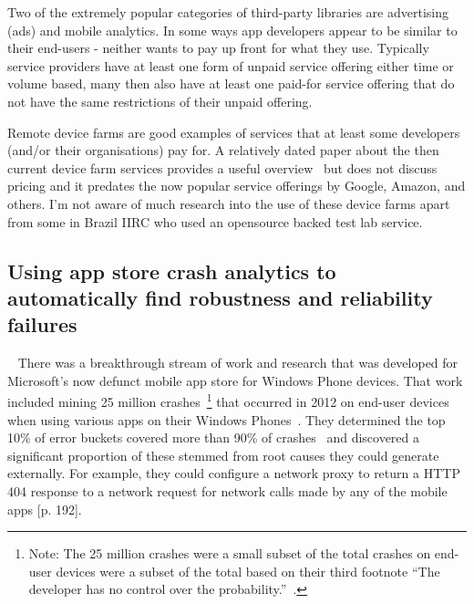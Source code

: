 Two of the extremely popular categories of third-party libraries are advertising (ads) and mobile analytics.
In some ways app developers appear to be similar to their end-users - neither wants to pay up front for what they use. Typically service providers have at least one form of unpaid service offering either time or volume based, many then also have at least one paid-for service offering that do not have the same restrictions of their unpaid offering.

Remote device farms are good examples of services that at least some developers (and/or their organisations) pay for. A relatively dated paper about the then current device farm services provides a useful overview~ but does not discuss pricing and it predates the now popular service offerings by Google, Amazon, and others. I'm not aware of much research into the use of these device farms apart from some in Brazil IIRC who used an opensource backed test lab service. 

\subsection{Using app store crash analytics to automatically find robustness and reliability failures}~\label{rw-windows-phone-store-crash-analysis-section}
There was a breakthrough stream of work and research that was developed for Microsoft's now defunct mobile app store for Windows Phone devices. That work included mining 25 million crashes~\footnote{Note: The 25 million crashes were a small subset of the total crashes on end-user devices were a subset of the total based on their third footnote ``The developer has no control over the probability.''~\cite[p. 191]{ravindrath2014_automatic_and_scalable_fault_detection_for_mobile_apps}.} that occurred in 2012 on end-user devices when using various apps on their Windows Phones~\cite[p. 190]{ravindrath2014_automatic_and_scalable_fault_detection_for_mobile_apps}. They determined the top 10\% of error buckets covered more than 90\% of crashes~\cite[p. 192]{ravindrath2014_automatic_and_scalable_fault_detection_for_mobile_apps} and discovered a significant proportion of these stemmed from root causes they could generate externally. For example, they could configure a network proxy to return a HTTP 404 response to a network request for network calls made by any of the mobile apps [p. 192].

